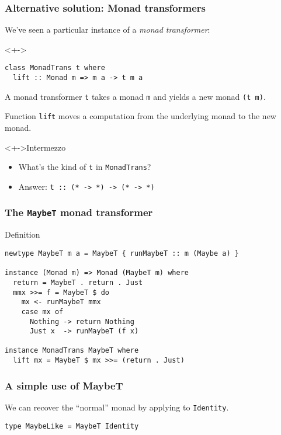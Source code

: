\documentclass[pdftex,aspectratio=169]{beamer}
\begin{document}
\begin{frame}[fragile]
  \frametitle{Alternative solution: Monad transformers}

  We've seen a particular instance of a \emph{monad transformer}:
  \begin{block}<+->{}
\begin{lstlisting}
class MonadTrans t where
  lift :: Monad m => m a -> t m a
\end{lstlisting}

\end{block}

A monad transformer \lstinline{t} takes a monad \lstinline{m} and yields a new monad
\lstinline{(t m)}.

Function \lstinline{lift} moves a computation from the underlying
monad to the new monad.

\begin{block}<+->{Intermezzo}
  \begin{itemize}[<+->]
  \item What's the kind of \lstinline{t} in \lstinline{MonadTrans}?
  \item Answer: \lstinline{t :: (* -> *) -> (* -> *)}
  \end{itemize}
\end{block}
\end{frame}

\begin{frame}[fragile]
  \frametitle{The \texttt{MaybeT} monad transformer}
  \begin{block}{Definition}
\begin{lstlisting}
newtype MaybeT m a = MaybeT { runMaybeT :: m (Maybe a) }

instance (Monad m) => Monad (MaybeT m) where
  return = MaybeT . return . Just
  mmx >>= f = MaybeT $ do
    mx <- runMaybeT mmx
    case mx of
      Nothing -> return Nothing
      Just x  -> runMaybeT (f x)

instance MonadTrans MaybeT where
  lift mx = MaybeT $ mx >>= (return . Just)
\end{lstlisting}
  \end{block}
\end{frame}

\begin{frame}[fragile]
  \frametitle{A simple use of MaybeT}
  We can recover the ``normal'' monad by applying to \lstinline{Identity}.
  \begin{block}{}
  \begin{lstlisting}
type MaybeLike = MaybeT Identity
  \end{lstlisting}
\end{block}
\end{frame}
\end{document}
